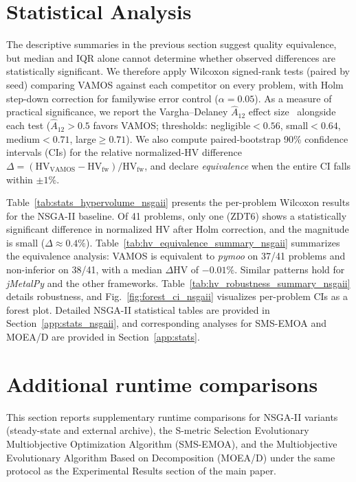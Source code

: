 \documentclass[final,5p,times,twocolumn]{elsarticle}
\newcommand{\VAMOS}{VAMOS}
\newcommand{\HV}{\mathrm{HV}}
\begin{document}
%

\section{Statistical Analysis}
\label{app:stats_main}

The descriptive summaries in the previous section suggest quality equivalence, but median and IQR alone cannot determine whether observed differences are statistically significant. We therefore apply Wilcoxon signed-rank tests (paired by seed) comparing \VAMOS{} against each competitor on every problem, with Holm step-down correction for familywise error control ($\alpha=0.05$). As a measure of practical significance, we report the Vargha--Delaney $\hat{A}_{12}$ effect size~\cite{VD00} alongside each test ($\hat{A}_{12}>0.5$ favors \VAMOS{}; thresholds: negligible${}<0.56$, small${}<0.64$, medium${}<0.71$, large${\ge}0.71$). We also compute paired-bootstrap 90\% confidence intervals (CIs) for the relative normalized-HV difference $\Delta = (\HV_{\text{VAMOS}} - \HV_{\text{fw}})/\HV_{\text{fw}}$, and declare \emph{equivalence} when the entire CI falls within $\pm 1\%$.

Table~\ref{tab:stats_hypervolume_nsgaii} presents the per-problem Wilcoxon results for the NSGA-II baseline. Of 41 problems, only one (ZDT6) shows a statistically significant difference in normalized HV after Holm correction, and the magnitude is small ($\Delta \approx 0.4\%$). Table~\ref{tab:hv_equivalence_summary_nsgaii} summarizes the equivalence analysis: \VAMOS{} is equivalent to \textit{pymoo}  on 37/41 problems and non-inferior on 38/41, with a median $\Delta$HV of $-0.01\%$. Similar patterns hold for \textit{jMetalPy} and the other frameworks. Table~\ref{tab:hv_robustness_summary_nsgaii} details robustness, and Fig.~\ref{fig:forest_ci_nsgaii} visualizes per-problem CIs as a forest plot. Detailed NSGA-II statistical tables are provided in Section~\ref{app:stats_nsgaii}, and corresponding analyses for SMS-EMOA and MOEA/D are provided in Section~\ref{app:stats}.

\section{Additional runtime comparisons}
\label{app:variants}
This section reports supplementary runtime comparisons for NSGA-II variants (steady-state and external archive), the S-metric Selection Evolutionary Multiobjective Optimization Algorithm (SMS-EMOA), and the Multiobjective Evolutionary Algorithm Based on Decomposition (MOEA/D) under the same protocol as the Experimental Results section of the main paper.
\end{document}
